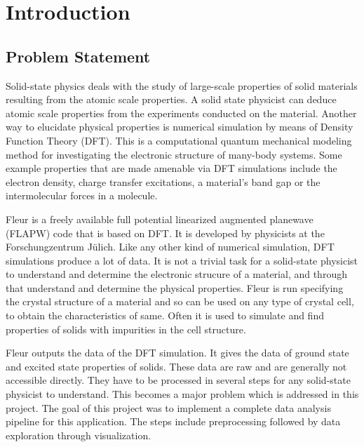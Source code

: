 
\chapter{Introduction}
\label{chap:intro}

\section{Problem Statement}
\label{sec:problem-statement}

Solid-state physics deals with the study of large-scale properties of solid materials resulting from the atomic scale properties. A solid state physicist can deduce atomic scale properties from the experiments conducted on the material. Another way to elucidate physical properties is numerical simulation by means of Density Function Theory (DFT). This is a computational quantum mechanical modeling method for investigating the electronic structure of many-body systems. Some example properties that are made amenable via DFT simulations include the electron density, charge transfer excitations, a material's band gap or the intermolecular forces in a molecule.

Fleur is a freely available full potential linearized augmented planewave (FLAPW) code that is based on DFT\cite{fleur}. It is developed by physicists at the Forschungzentrum Jülich. Like any other kind of numerical simulation, DFT simulations produce a lot of data. It is not a trivial task for a solid-state physicist to understand and determine the electronic strucure of a material, and through that understand and determine the physical properties. Fleur is run specifying the crystal structure of a material and so can be used on any type of crystal cell, to obtain the characteristics of same. Often it is used to simulate and find properties of solids with impurities in the cell structure.

Fleur outputs the data of the DFT simulation. It gives the data of ground state and excited state properties of solids. These data are raw and are generally not accessible directly. They have to be processed in several steps for any solid-state physicist to understand. This becomes a major problem which is addressed in this project. The goal of this project was to implement a complete data analysis pipeline for this application. The steps include preprocessing followed by data exploration through visualization.



